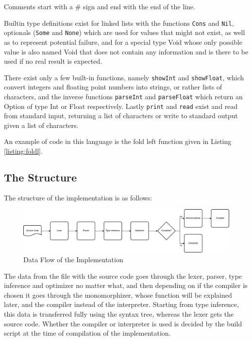 \documentclass[12pt]{article}
\newcommand{\importListing}[1]{
    \begin{minipage}{\textwidth}
    
    \end{minipage}
}
\begin{document}
Comments start with a $\#$ sign and end with the end of the line.


Builtin type definitions exist for linked lists with the functions \texttt{Cons} and \texttt{Nil},
optionals (\texttt{Some} and \texttt{None}) which are used for
values that might not exist, as well as to represent potential failure,
and for a special type Void whose only possible value is also named Void
that does not contain any information and is there to
be used if no real result is expected.

There exist only a few built-in functions, namely
\texttt{showInt} and \texttt{showFloat}, which convert integers and floating point numbers
into strings, or rather lists of characters, and the inverse functions \texttt{parseInt} and
\texttt{parseFloat} which return an Option of type Int or Float respectively.
Lastly \texttt{print} and \texttt{read} exist and read from standard input, returning a list
of characters or write to standard output given a list of characters.

\importListing{code/foldl.tex}

An example of code in this language is the fold left function
given in Listing \ref{listing:foldl}.

\subsection{The Structure}
The structure of the implementation is as follows:
\begin{figure}[H]
	\centering
	\includegraphics[width=\textwidth]{diagrams/DataFlow.png}
	\caption{Data Flow of the Implementation}
\end{figure}
The data from the file with the source code goes through the lexer,
parser, type inference and optimizer no matter what, and then depending
on if the compiler is chosen it goes through the monomorphizer, whose function will be explained later, and
the compiler instead of the interpreter.
Starting from type inference, this data is transferred fully using the syntax tree,
whereas the lexer gets the source code. Whether the compiler or interpreter is used
is decided by the build script at the time of compilation
of the implementation.
\end{document}
